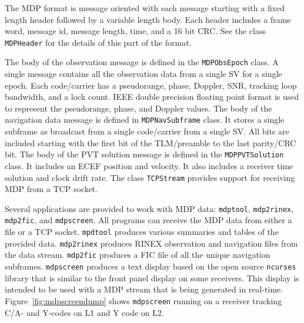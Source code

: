 \documentclass{ion-gps}
\newcommand{\gpstkapplication}[1]{\texttt{#1}}
\newcommand{\gpstkclass}[1]{\texttt{#1}}
\begin{document}
The MDP format is message oriented with each message starting with a
fixed length header followed by a variable length body. Each header
includes a frame word, message id, message length, time, and a 16 bit
CRC. See the class \gpstkclass{MDPHeader} for the details of this part
of the format.  

The body of the observation message is defined in the
\gpstkclass{MDPObsEpoch} class.  A single message contains all the
observation data from a single SV for a single epoch. Each
code/carrier has a pseudorange, phase, Doppler, SNR, tracking loop
bandwidth, and a lock count. IEEE double precision floating point
format is used to represent the pseudorange, phase, and Doppler
values. The body of the navigation data message is defined in
\gpstkclass{MDPNavSubframe} class. It stores a single subframe as
broadcast from a single code/carrier from a single SV. All bits are
included starting with the first bit of the TLM/preamble to the last
parity/CRC bit.  The body of the PVT solution message is defined in the
\gpstkclass{MDPPVTSolution} class. It includes an ECEF position and
velocity. It also includes a receiver time solution and clock drift
rate. The class \gpstkclass{TCPStream} provides support for receiving
MDP from a TCP socket.

Several applications are provided to work with MDP data:
\gpstkapplication{mdptool},
\gpstkapplication{mdp2rinex}, \gpstkapplication{mdp2fic}, and
\gpstkapplication{mdpscreen}. All programs can receive the MDP data
from either a file or a TCP socket. \gpstkapplication{mpdtool}
produces various summaries and tables of the provided
data. \gpstkapplication{mdp2rinex} produces RINEX observation and
navigation files from the data stream. \gpstkapplication{mdp2fic}
produces a FIC file of all the unique navigation
subframes. \gpstkapplication{mdpscreen} produces a
text display based on the open source \gpstkapplication{ncurses}\cite{ncurses}
library that is similar to the front panel display on some
receivers. This display is intended to be used with a MDP stream
that is being generated in real-time. Figure~\ref{fig:mdpscreendump} 
shows \gpstkapplication{mdpscreen} running on a receiver tracking C/A-
and Y-codes on L1 and Y code on L2.
\end{document}
